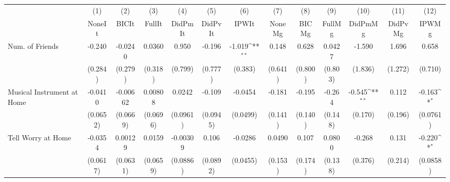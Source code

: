 {
\def\sym#1{\ifmmode^{#1}\else\(^{#1}\)\fi}
\begin{tabular}{l*{12}{c}}
\toprule
            &\multicolumn{1}{c}{(1)}&\multicolumn{1}{c}{(2)}&\multicolumn{1}{c}{(3)}&\multicolumn{1}{c}{(4)}&\multicolumn{1}{c}{(5)}&\multicolumn{1}{c}{(6)}&\multicolumn{1}{c}{(7)}&\multicolumn{1}{c}{(8)}&\multicolumn{1}{c}{(9)}&\multicolumn{1}{c}{(10)}&\multicolumn{1}{c}{(11)}&\multicolumn{1}{c}{(12)}\\
            &\multicolumn{1}{c}{NoneIt}&\multicolumn{1}{c}{BICIt}&\multicolumn{1}{c}{FullIt}&\multicolumn{1}{c}{DidPmIt}&\multicolumn{1}{c}{DidPvIt}&\multicolumn{1}{c}{IPWIt}&\multicolumn{1}{c}{NoneMg}&\multicolumn{1}{c}{BICMg}&\multicolumn{1}{c}{FullMg}&\multicolumn{1}{c}{DidPmMg}&\multicolumn{1}{c}{DidPvMg}&\multicolumn{1}{c}{IPWMg}\\
\midrule
Num. of Friends&      -0.240         &     -0.0240         &      0.0360         &       0.950         &      -0.196         &      -1.019\sym{**} &       0.148         &       0.628         &      0.0427         &      -1.590         &       1.696         &       0.658         \\
            &     (0.284)         &     (0.279)         &     (0.318)         &     (0.799)         &     (0.777)         &     (0.383)         &     (0.641)         &     (0.800)         &     (0.803)         &     (1.836)         &     (1.272)         &     (0.710)         \\
\addlinespace
Musical Instrument at Home&     -0.0410         &    -0.00662         &     0.00808         &      0.0242         &      -0.109         &     -0.0454         &      -0.181         &      -0.195         &      -0.264         &      -0.545\sym{**} &       0.112         &      -0.163\sym{*}  \\
            &    (0.0652)         &    (0.0669)         &    (0.0696)         &    (0.0961)         &    (0.0945)         &    (0.0499)         &     (0.141)         &     (0.140)         &     (0.148)         &     (0.170)         &     (0.196)         &    (0.0761)         \\
\addlinespace
Tell Worry at Home&     -0.0354         &     0.00129         &      0.0159         &    -0.00309         &       0.106         &     -0.0286         &      0.0490         &       0.107         &      0.0800         &      -0.268         &       0.131         &      -0.220\sym{*}  \\
            &    (0.0617)         &    (0.0631)         &    (0.0659)         &    (0.0886)         &    (0.0892)         &    (0.0455)         &     (0.153)         &     (0.174)         &     (0.138)         &     (0.376)         &     (0.214)         &    (0.0858)         \\

\end{tabular}}
